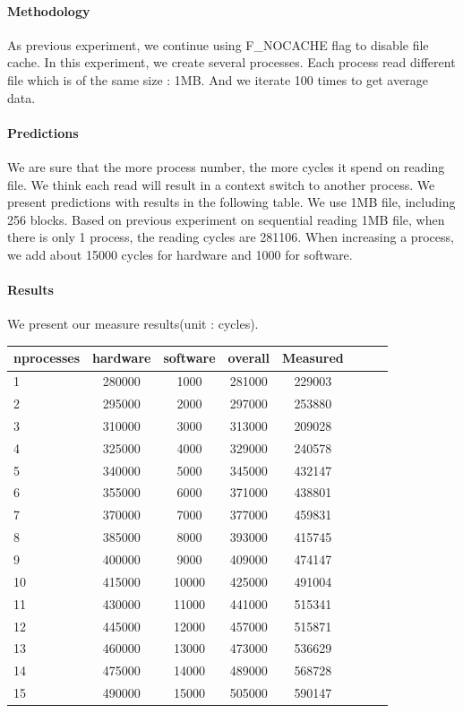 \paragraph{Methodology}
As previous experiment, we continue using F\_NOCACHE flag to disable file cache. In this experiment, we create several processes. Each process read different file which is of the same size : 1MB. And we iterate 100 times to get average data. 

\paragraph{Predictions}
We are sure that the more process number, the more cycles it spend on reading file. We think each read will result in a context switch to another process. We present predictions with results in the following table. We use 1MB file, including 256 blocks. Based on previous experiment on sequential reading 1MB file, when there is only 1 process, the reading cycles are 281106. When increasing a process, we add about 15000 cycles for hardware and 1000 for software.

\paragraph{Results}
We present our measure results(unit : cycles). 

\begin{center}
\begin{tabular}{l*{6}{c}r}
nprocesses             &  hardware & software & overall & Measured\\
\hline
1 & 280000 & 1000 & 281000 & 229003 \\
2 & 295000 & 2000 & 297000 & 253880 \\
3 & 310000 & 3000 & 313000 & 209028 \\
4 & 325000 & 4000 & 329000 & 240578 \\
5 & 340000 & 5000 & 345000 & 432147 \\
6 & 355000 & 6000 & 371000 & 438801 \\
7 & 370000 &7000 & 377000 & 459831 \\
8 & 385000 & 8000 & 393000 & 415745 \\
9 & 400000 & 9000 & 409000 & 474147 \\
10 & 415000 & 10000 & 425000 & 491004\\
11 & 430000 & 11000 & 441000 & 515341 \\
12 & 445000 & 12000 & 457000 & 515871 \\
13 & 460000 & 13000 & 473000 & 536629\\
14 & 475000 & 14000 & 489000 & 568728\\
15 & 490000 & 15000 & 505000 & 590147\\

\end{tabular}
\end{center}


